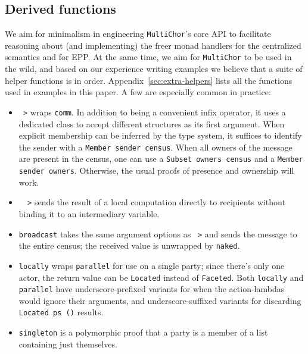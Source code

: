 \documentclass[sigplan,screen,review,anonymous]{acmart}
\newcommand{\inlinecode}[2][haskell]{\texttt{#2}}
\newcommand{\MultiChor}{\texttt{Multi\-Chor}\xspace}
\begin{document}
\subsection{Derived functions}\label{sec:helpers}
We aim for minimalism in engineering \MultiChor's core API to facilitate reasoning about
(and implementing) the freer monad handlers for the centralized semantics and for EPP.
At the same time, we aim for \MultiChor to be used in the wild,
and based on our experience writing examples
we believe that a suite of helper functions is in order.
Appendix~\ref{sec:extra-helpers} lists all the functions used in examples in this paper.
A few are especially common in practice:
\begin{itemize}[leftmargin=12pt, topsep=2pt]
    \item \inlinecode{~>} wraps \inlinecode{comm}.
          In addition to being a convenient infix operator,
          it uses a dedicated class to accept different structures as its first argument.
          When explicit membership can be inferred by the type system,
          it suffices to identify the sender with a \inlinecode{Member sender census}.
          When all owners of the message are present in the census,
          one can use a \inlinecode{Subset owners census} and a \inlinecode{Member sender owners}.
          Otherwise, the usual proofs of presence and ownership will work.
    \item \inlinecode{~~>} sends the result of a local computation directly to recipients
          without binding it to an intermediary variable.
    \item \inlinecode{broadcast} takes the same argument options as \inlinecode{~>}
          and sends the message to the entire census;
          the received value is unwrapped by \inlinecode{naked}.
    \item \inlinecode{locally} wraps \inlinecode{parallel} for use on a single party;
          since there's only one actor, the return value can be \inlinecode{Located}
          instead of \inlinecode{Faceted}.
          Both \inlinecode{locally} and \inlinecode{parallel} have underscore-prefixed
          variants for when the action-lambdas would ignore their arguments,
          and underscore-suffixed variants for discarding \inlinecode{Located ps ()} results.
    \item \inlinecode{singleton} is a polymorphic proof that a party is a member of a list
          containing just themselves. 
\end{itemize}
\end{document}
